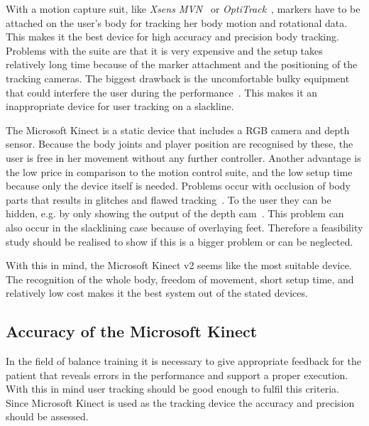 With a motion capture suit, like \textit{Xsens MVN}~\cite{XsensMvn} or \textit{OptiTrack}~\cite{OptiTrack}, markers have to be attached on the user’s body for tracking her body motion and rotational data. This makes it the best device for high accuracy and precision body tracking. Problems with the suite are that it is very expensive and the setup takes relatively long time because of the marker attachment and the positioning of the tracking cameras. The biggest drawback is the uncomfortable bulky equipment that could interfere the user during the performance~\cite{Bogdanovych2015-ci, Chang2012-hz, Nusman2006-rf}. This makes it an inappropriate device for user tracking on a slackline.

The Microsoft Kinect is a static device that includes a RGB camera and depth sensor. Because the body joints and player position are recognised by these, the user is free in her movement without any further controller. Another advantage is the low price in comparison to the motion control suite, and the low setup time because only the device itself is needed. Problems occur with occlusion of body parts that results in glitches and flawed tracking~\cite{Kajastila2014-ug, Tang2015-wt}. To the user they can be hidden, e.g. by only showing the output of the depth cam~\cite{Holsti2013-kn}. This problem can also occur in the slacklining case because of overlaying feet. Therefore a feasibility study should be realised to show if this is a bigger problem or can be neglected. 

With this in mind, the Microsoft Kinect v2 seems like the most suitable device. The recognition of the whole body, freedom of movement, short setup time, and relatively low cost makes it the best system out of the stated devices.

\subsection{Accuracy of the Microsoft Kinect}

In the field of balance training it is necessary to give appropriate feedback for the patient that reveals errors in the performance and support a proper execution. With this in mind user tracking should be good enough to fulfil this criteria. Since Microsoft Kinect is used as the tracking device the accuracy and precision should be assessed.

